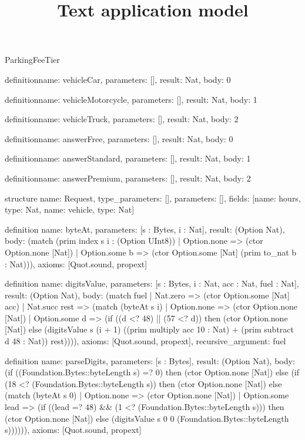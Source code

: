 \begin{lexlean}{ParkingFeeTier}
\title{Text application model}
\begin{semanticmodule}
definition{name: vehicleCar, parameters: [], result: Nat, body: 0}

definition{name: vehicleMotorcycle, parameters: [], result: Nat, body: 1}

definition{name: vehicleTruck, parameters: [], result: Nat, body: 2}

definition{name: answerFree, parameters: [], result: Nat, body: 0}

definition{name: answerStandard, parameters: [], result: Nat, body: 1}

definition{name: answerPremium, parameters: [], result: Nat, body: 2}

structure{
  name: Request,
  type_parameters: [],
  parameters: [],
  fields: [{name: hours, type: Nat}, {name: vehicle, type: Nat}]
}

definition{
  name: byteAt,
  parameters: [s : Bytes, i : Nat],
  result: (Option Nat),
  body: (match (prim index s i : (Option UInt8))
    | Option.none => (ctor Option.none [Nat])
    | Option.some b => (ctor Option.some [Nat] (prim to_nat b : Nat))),
  axioms: [Quot.sound, propext]
}

definition{
  name: digitsValue,
  parameters: [s : Bytes, i : Nat, acc : Nat, fuel : Nat],
  result: (Option Nat),
  body: (match fuel
    | Nat.zero => (ctor Option.some [Nat] acc)
    | Nat.succ rest => (match (byteAt s i)
      | Option.none => (ctor Option.none [Nat])
      | Option.some d => (if ((d <? 48) || (57 <? d)) then (ctor Option.none [Nat]) else (digitsValue s (i + 1) ((prim multiply acc 10 : Nat) + (prim subtract d 48 : Nat)) rest)))),
  axioms: [Quot.sound, propext],
  recursive_argument: fuel
}

definition{
  name: parseDigits,
  parameters: [s : Bytes],
  result: (Option Nat),
  body: (if ((Foundation.Bytes::byteLength s) =? 0) then (ctor Option.none [Nat]) else (if (18 <? (Foundation.Bytes::byteLength s)) then (ctor Option.none [Nat]) else (match (byteAt s 0)
    | Option.none => (ctor Option.none [Nat])
    | Option.some lead => (if ((lead =? 48) && (1 <? (Foundation.Bytes::byteLength s))) then (ctor Option.none [Nat]) else (digitsValue s 0 0 (Foundation.Bytes::byteLength s)))))),
  axioms: [Quot.sound, propext]
}


\end{semanticmodule}
\end{lexlean}
